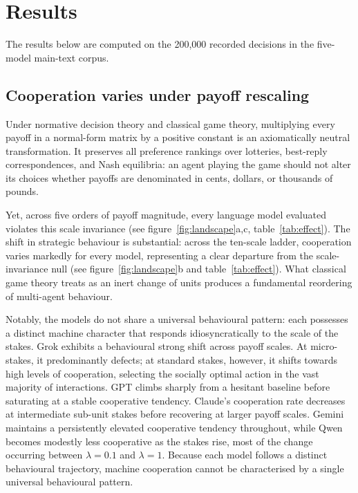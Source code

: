\documentclass[11pt,a4paper]{article}
\newcommand{\lam}{\lambda}
\begin{document}
\section{Results}\label{sec:results}

The results below are computed on the 200{,}000 recorded decisions in the
five-model main-text corpus.

\subsection{Cooperation varies under payoff rescaling }\label{sec:payoff_magnitude}

Under normative decision theory and classical game theory, multiplying every
payoff in a normal-form matrix by a positive constant is an axiomatically
neutral transformation. It preserves all preference rankings over lotteries,
best-reply correspondences, and Nash equilibria: an agent playing the game
should not alter its choices whether payoffs are denominated in cents, dollars,
or thousands of pounds.

Yet, across five orders of payoff magnitude, every language model
evaluated violates this scale invariance (see figure~\ref{fig:landscape}a,c,
table~\ref{tab:effect}). The shift in strategic behaviour is substantial: across
the ten-scale ladder, cooperation varies markedly for every model, representing a clear departure from the scale-invariance null (see figure~\ref{fig:landscape}b and
table~\ref{tab:effect}). What classical game theory treats as an inert change of
units produces a fundamental reordering of multi-agent behaviour.

Notably, the models do not share a universal behavioural pattern: each
possesses a distinct machine character that responds idiosyncratically to the
scale of the stakes. Grok exhibits a behavioural strong shift across payoff scales. At micro-stakes, it predominantly  defects; at standard stakes, however, it shifts towards high levels of cooperation, selecting the socially optimal action in the vast majority of interactions. 
GPT climbs sharply
from a hesitant baseline before saturating at a stable cooperative tendency.
Claude’s cooperation rate decreases  at intermediate sub-unit stakes before recovering at larger payoff scales. Gemini maintains a persistently
elevated cooperative tendency throughout, while Qwen becomes modestly less cooperative as the stakes rise, most of the change occurring between $\lam = 0.1$ and $\lam = 1$.
Because each model follows a distinct behavioural trajectory, machine cooperation cannot be characterised by a single universal behavioural pattern.
\end{document}
